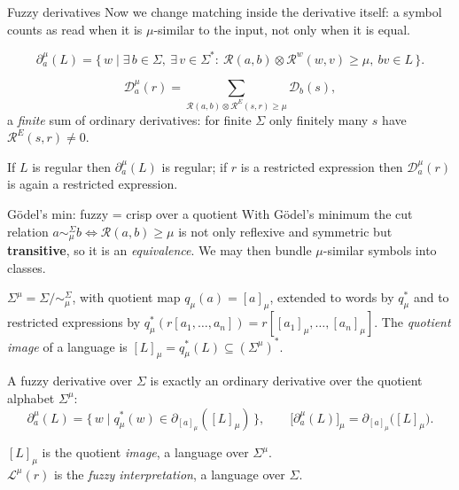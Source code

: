 \documentclass[aspectratio=169]{beamer}
\newcommand{\cR}{\mathcal{R}}
\newcommand{\cut}{\mu}
\newcommand{\Dd}{\mathcal{D}}                 %
\begin{document}
\begin{frame}{Fuzzy derivatives}
  \small
  Now we change matching inside the derivative itself: a symbol counts as read
  when it is $\cut$-similar to the input, not only when it is equal.
  \begin{definition}
    \[
      \partial_a^\cut(L)=\{\,w\mid \exists\,b\in\Sigma,\ \exists\,v\in\Sigma^*:\
        \cR(a,b)\otimes\cR^w(w,v)\ge\cut,\ bv\in L\,\}.
    \]
  \end{definition}
  \begin{definition}
    \[
      \Dd_a^\cut(r)=\!\!\sum_{\cR(a,b)\otimes\cR^E(s,r)\ge\cut}\!\!\Dd_b(s),
    \]
    a \emph{finite} sum of ordinary derivatives: for finite $\Sigma$ only finitely
    many $s$ have $\cR^E(s,r)\neq0$.
  \end{definition}
  \begin{theorem}
    If $L$ is regular then $\partial_a^\cut(L)$ is regular; if $r$ is a
    restricted expression then $\Dd_a^\cut(r)$ is again a restricted expression.
  \end{theorem}
\end{frame}

\begin{frame}{G\"odel's min: fuzzy = crisp over a quotient}
  \small
  With G\"odel's minimum the cut relation
  $a\sim_\cut^\Sigma b \iff \cR(a,b)\ge\cut$ is not only reflexive and symmetric
  but \textbf{transitive}, so it is an \emph{equivalence}. We may then bundle
  $\cut$-similar symbols into classes.
  \begin{definition}
    $\Sigma^\cut=\Sigma/{\sim_\cut^\Sigma}$, with quotient map
    $q_\cut(a)=[a]_\cut$, extended to words by $q_\cut^*$ and to restricted
    expressions by $q_\cut^*(r[a_1,\dots,a_n])=r[[a_1]_\cut,\dots,[a_n]_\cut]$.
    The \emph{quotient image} of a language is
    $[L]_\cut=q_\cut^*(L)\subseteq(\Sigma^\cut)^*$.
  \end{definition}
  \begin{theorem}
    A fuzzy derivative over $\Sigma$ is exactly an ordinary derivative over the
    quotient alphabet $\Sigma^\cut$:
    \[
      \partial_a^\cut(L)=\{\,w\mid q_\cut^*(w)\in\partial_{[a]_\cut}([L]_\cut)\,\},
      \qquad
      \big[\partial_a^\cut(L)\big]_\cut=\partial_{[a]_\cut}\big([L]_\cut\big).
    \]
  \end{theorem}
  {\footnotesize
  $[L]_\cut$ is the quotient \emph{image}, a language over $\Sigma^\cut$. \\
  $\mathcal L^\cut(r)$ is the \emph{fuzzy interpretation}, a language over $\Sigma$.}
\end{frame}
\end{document}
